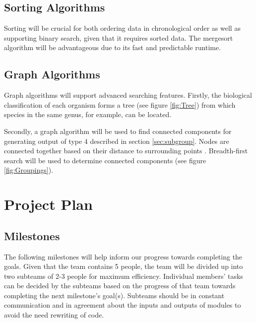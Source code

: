 \documentclass{article}
\begin{document}
\subsection{Sorting Algorithms}
Sorting will be crucial for both ordering data in chronological order as well as supporting binary search, given that it requires sorted data. The mergesort algorithm will be advantageous due to its fast and predictable runtime.

\subsection{Graph Algorithms}\label{sec:graphalgs}
Graph algorithms will support advanced searching features. Firstly, the biological classification of each organism forms a tree (see figure \ref{fig:Tree}) from which species in the same genus, for example, can be located. 

Secondly, a graph algorithm will be used to find connected components for generating output of type 4 described in section \ref{sec:subgroup}. Nodes are connected together based on their distance to surrounding points \citep{tom10}. Breadth-first search will be used to determine connected components \citep{broder2000graph} (see figure \ref{fig:Groupings}).

\clearpage
\section{Project Plan}
\subsection{Milestones}
The following milestones will help inform our progress towards completing the goals. Given that the team contains 5 people, the team will be divided up into two subteams of 2-3 people for maximum efficiency. Individual members' tasks can be decided by the subteams based on the progress of that team towards completing the next milestone's goal(s). Subteams should be in constant communication and in agreement about the inputs and outputs of modules to avoid the need rewriting of code.
\end{document}
